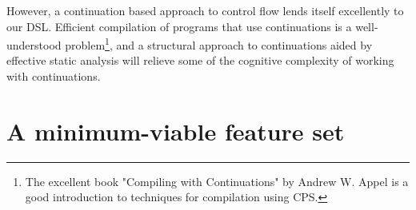 However, a continuation based approach to control flow lends itself excellently to our \ac{DSL}. Efficient compilation of programs that use continuations is a well-understood problem\footnote{The excellent book "Compiling with Continuations" by Andrew W. Appel \cite{Appel1992} is a good introduction to techniques for compilation using \acf{CPS}.}, and a structural approach to continuations aided by effective static analysis will relieve some of the cognitive complexity of working with continuations.


\section{A minimum-viable feature set}
\label{sec:design_features}

